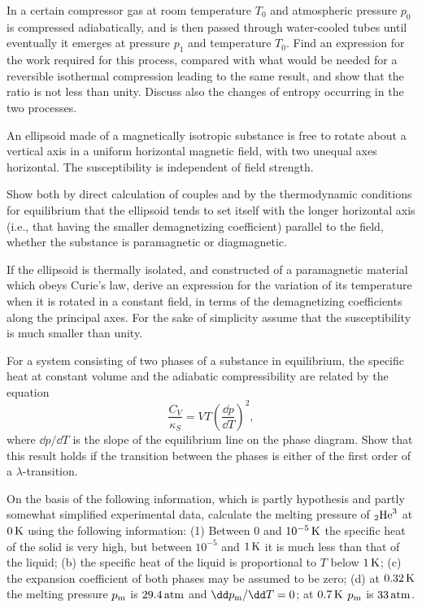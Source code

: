 \bigskip{}
In a certain compressor gas at room temperature $T_0$
and atmospheric pressure $p_0$ is compressed adiabatically,
and is then passed through water-cooled tubes until eventually
it emerges at pressure $p_1$ and temperature $T_0$.
Find an expression for the work required for this process,
compared with what would be needed for a reversible
isothermal compression leading to the same result,
and show that the ratio is not less than unity.
Discuss also the changes of entropy occurring in the two processes.

\bigskip{}
An ellipsoid made of a magnetically isotropic substance
is free to rotate about a vertical axis
in a uniform horizontal magnetic field,
with two unequal axes horizontal.
The susceptibility is independent of field strength.

\smallskip\subp
Show both by direct calculation of couples and
by the thermodynamic conditions for equilibrium that
the ellipsoid tends to set itself with the longer horizontal axis
(i.e., that having the smaller demagnetizing coefficient)
parallel to the field, whether the substance is paramagnetic or diagmagnetic.

\smallskip\subp
If the ellipsoid is thermally isolated,
and constructed of a paramagnetic material which obeys Curie's law,
derive an expression for the variation of its temperature
when it is rotated in a constant field,
in terms of the demagnetizing coefficients along the principal axes.
For the sake of simplicity assume that the susceptibility
is much smaller than unity.

\bigskip{}
For a system consisting of two phases of a substance in equilibrium,
the specific heat at constant volume and the adiabatic compressibility
are related by the equation
$$ \frac{C_V}{\kappa_S} = VT \left(\frac{\dd p}{\dd T}\right)^2,$$
where $\dd p/\dd T$ is the slope of the equilibrium line on the phase diagram.
Show that this result holds if the transition between the phases
is either of the first order of a $\lambda$-transition.

\bigskip{}
On the basis of the following information, which is partly hypothesis
and partly somewhat simplified experimental data,
calculate the melting pressure of ${}_2{\rm He}^3$ at $0\,{\rm K}$
using the following information:
(1)
Between $0$ and $\rm 10^{-5}\,K$ the specific heat of the solid is very high,
but between $10^{-5}$ and $\rm 1\,K$ it is much less than that of the liquid;
(b)
the specific heat of the liquid is proportional to $T$ below $\rm 1\,K$;
(c)
the expansion coefficient of both phases may be assumed to be zero;
(d)
at $\rm 0.32\,K$ the melting pressure $p_{\rm m}$ is $\rm 29.4\,atm$
and $\dd p_{\rm m}/\dd T = 0$;
at $\rm 0.7\,K$ $p_{\rm m}$ is $\rm 33\,atm$.

